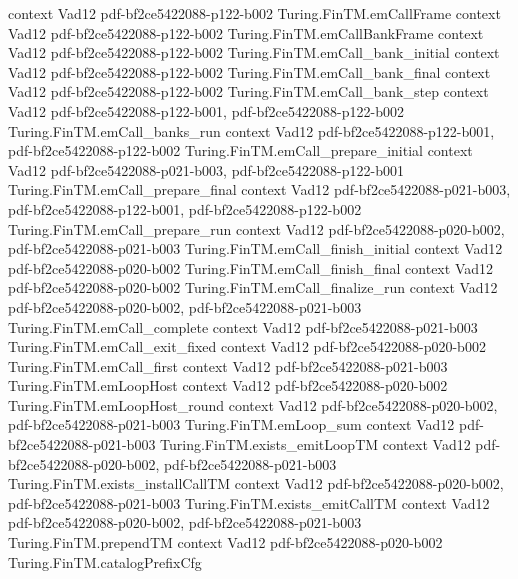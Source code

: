 \begin{theorem}
  {context}
  {Vad12}
  {pdf-bf2ce5422088-p122-b002}
\proofstep
  {Turing.FinTM.emCallFrame}
  {context}
  {Vad12}
  {pdf-bf2ce5422088-p122-b002}
\proofstep
  {Turing.FinTM.emCallBankFrame}
  {context}
  {Vad12}
  {pdf-bf2ce5422088-p122-b002}
\proofstep
  {Turing.FinTM.emCall_bank_initial}
  {context}
  {Vad12}
  {pdf-bf2ce5422088-p122-b002}
\proofstep
  {Turing.FinTM.emCall_bank_final}
  {context}
  {Vad12}
  {pdf-bf2ce5422088-p122-b002}
\proofstep
  {Turing.FinTM.emCall_bank_step}
  {context}
  {Vad12}
  {pdf-bf2ce5422088-p122-b001,
    pdf-bf2ce5422088-p122-b002}
\proofstep
  {Turing.FinTM.emCall_banks_run}
  {context}
  {Vad12}
  {pdf-bf2ce5422088-p122-b001,
    pdf-bf2ce5422088-p122-b002}
\proofstep
  {Turing.FinTM.emCall_prepare_initial}
  {context}
  {Vad12}
  {pdf-bf2ce5422088-p021-b003,
    pdf-bf2ce5422088-p122-b001}
\proofstep
  {Turing.FinTM.emCall_prepare_final}
  {context}
  {Vad12}
  {pdf-bf2ce5422088-p021-b003,
    pdf-bf2ce5422088-p122-b001,
    pdf-bf2ce5422088-p122-b002}
\proofstep
  {Turing.FinTM.emCall_prepare_run}
  {context}
  {Vad12}
  {pdf-bf2ce5422088-p020-b002,
    pdf-bf2ce5422088-p021-b003}
\proofstep
  {Turing.FinTM.emCall_finish_initial}
  {context}
  {Vad12}
  {pdf-bf2ce5422088-p020-b002}
\proofstep
  {Turing.FinTM.emCall_finish_final}
  {context}
  {Vad12}
  {pdf-bf2ce5422088-p020-b002}
\proofstep
  {Turing.FinTM.emCall_finalize_run}
  {context}
  {Vad12}
  {pdf-bf2ce5422088-p020-b002,
    pdf-bf2ce5422088-p021-b003}
\proofstep
  {Turing.FinTM.emCall_complete}
  {context}
  {Vad12}
  {pdf-bf2ce5422088-p021-b003}
\proofstep
  {Turing.FinTM.emCall_exit_fixed}
  {context}
  {Vad12}
  {pdf-bf2ce5422088-p020-b002}
\proofstep
  {Turing.FinTM.emCall_first}
  {context}
  {Vad12}
  {pdf-bf2ce5422088-p021-b003}
\proofstep
  {Turing.FinTM.emLoopHost}
  {context}
  {Vad12}
  {pdf-bf2ce5422088-p020-b002}
\proofstep
  {Turing.FinTM.emLoopHost_round}
  {context}
  {Vad12}
  {pdf-bf2ce5422088-p020-b002,
    pdf-bf2ce5422088-p021-b003}
\proofstep
  {Turing.FinTM.emLoop_sum}
  {context}
  {Vad12}
  {pdf-bf2ce5422088-p021-b003}
\proofstep
  {Turing.FinTM.exists_emitLoopTM}
  {context}
  {Vad12}
  {pdf-bf2ce5422088-p020-b002,
    pdf-bf2ce5422088-p021-b003}
\proofstep
  {Turing.FinTM.exists_installCallTM}
  {context}
  {Vad12}
  {pdf-bf2ce5422088-p020-b002,
    pdf-bf2ce5422088-p021-b003}
\proofstep
  {Turing.FinTM.exists_emitCallTM}
  {context}
  {Vad12}
  {pdf-bf2ce5422088-p020-b002,
    pdf-bf2ce5422088-p021-b003}
\proofstep
  {Turing.FinTM.prependTM}
  {context}
  {Vad12}
  {pdf-bf2ce5422088-p020-b002}
\proofstep
  {Turing.FinTM.catalogPrefixCfg}

\end{theorem}
